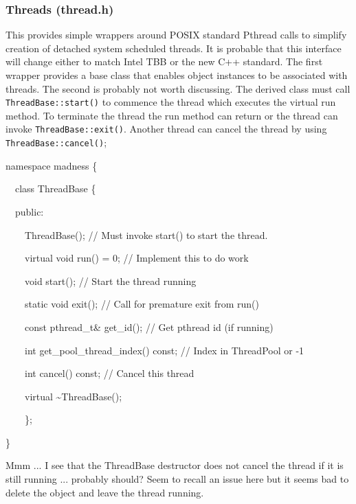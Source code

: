\documentclass[letterpaper]{article}
\begin{document}
\bigskip

\subsubsection{Threads (thread.h)}
This provides simple wrappers around POSIX standard Pthread calls to simplify creation of detached system scheduled
threads. It is probable that this interface will change either to match Intel TBB or the new C++ standard. The first
wrapper provides a base class that enables object instances to be associated with threads. The second is probably not
worth discussing. The derived class must call \texttt{ThreadBase::start()} to commence the thread which executes the
virtual run method. To terminate the thread the run method can return or the thread can invoke
\texttt{ThreadBase::exit()}. Another thread can cancel the thread by using \texttt{ThreadBase::cancel()};

{\ttfamily
namespace madness \{}

{\ttfamily
\ \ class ThreadBase \{}

{\ttfamily
\ \ public:}

{\ttfamily
\ \ \ \ ThreadBase(); // Must invoke start() to start the thread.}

{\ttfamily
\ \ \ \ virtual void run() = 0; // Implement this to do work}

{\ttfamily
\ \ \ \ void start(); // Start the thread running}

{\ttfamily
\ \ \ \ static void exit(); // Call for premature exit from run()}

{\ttfamily
\ \ \ \ const pthread\_t\& get\_id(); // Get pthread id (if running)}

{\ttfamily
\ \ \ \ int get\_pool\_thread\_index() const; // Index in ThreadPool or -1}

{\ttfamily
\ \ \ \ int cancel() const; // Cancel this thread}

{\ttfamily
\ \ \ \ virtual \~{}ThreadBase();}

{\ttfamily
\ \ \ \ \};}

{\ttfamily
\}}


\bigskip

Mmm ... I see that the ThreadBase destructor does not cancel the thread if it is still running ... probably should? Seem
to recall an issue here but it seems bad to delete the object and leave the thread running. 
\end{document}
